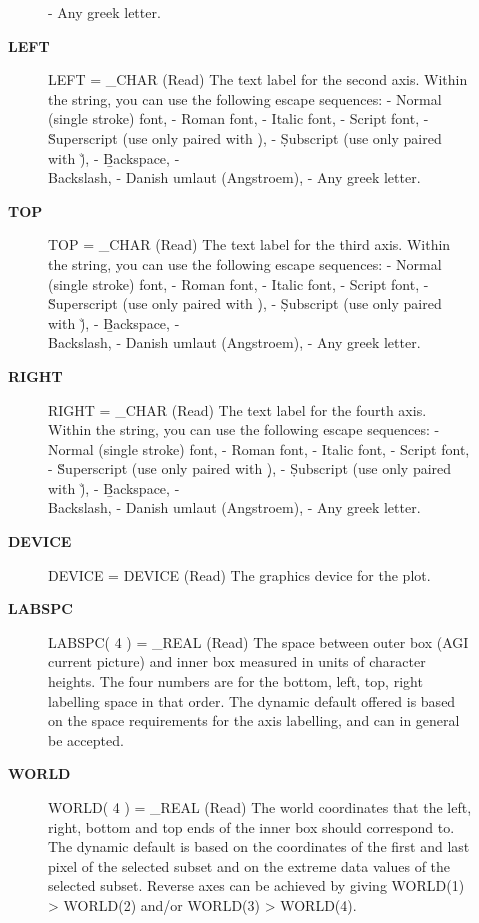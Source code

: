 \begin{description}
\begin{description}
   - \g  Any greek letter.
\item [{\bf LEFT}]
LEFT = _CHAR (Read)
   The text label for the second axis. Within the string, you can
   use the following escape sequences:
   - \fn Normal (single stroke) font,
   - \fr Roman font,
   - \fi Italic font,
   - \fs Script font,
   - \u  Superscript (use only paired with \d),
   - \d  Subscript (use only paired with \u),
   - \b  Backspace,
   - \\  Backslash,
   - \A  Danish umlaut (Angstroem),
   - \g  Any greek letter.
\item [{\bf TOP}]
TOP = _CHAR (Read)
   The text label for the third axis. Within the string, you can
   use the following escape sequences:
   - \fn Normal (single stroke) font,
   - \fr Roman font,
   - \fi Italic font,
   - \fs Script font,
   - \u  Superscript (use only paired with \d),
   - \d  Subscript (use only paired with \u),
   - \b  Backspace,
   - \\  Backslash,
   - \A  Danish umlaut (Angstroem),
   - \g  Any greek letter.
\item [{\bf RIGHT}]
RIGHT = _CHAR (Read)
   The text label for the fourth axis. Within the string, you can
   use the following escape sequences:
   - \fn Normal (single stroke) font,
   - \fr Roman font,
   - \fi Italic font,
   - \fs Script font,
   - \u  Superscript (use only paired with \d),
   - \d  Subscript (use only paired with \u),
   - \b  Backspace,
   - \\  Backslash,
   - \A  Danish umlaut (Angstroem),
   - \g  Any greek letter.
\item [{\bf DEVICE}]
DEVICE = DEVICE (Read)
   The graphics device for the plot.
\item [{\bf LABSPC}]
LABSPC( 4 ) = _REAL (Read)
   The space between outer box (AGI current picture) and inner box
   measured in units of character heights. The four numbers are
   for the bottom, left, top, right labelling space in that order.
   The dynamic default offered is based on the space requirements
   for the axis labelling, and can in general be accepted.
\item [{\bf WORLD}]
WORLD( 4 ) = _REAL (Read)
   The world coordinates that the left, right, bottom and top ends
   of the inner box should correspond to.
   The dynamic default is based on the coordinates of the first
   and last pixel of the selected subset and on the extreme data
   values of the selected subset. Reverse axes can be achieved by
   giving WORLD(1) > WORLD(2) and/or WORLD(3) > WORLD(4).


\end{description}
\end{description}
